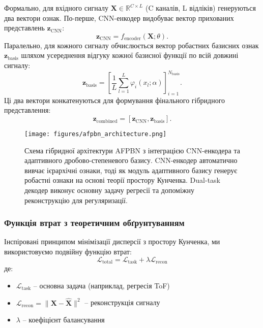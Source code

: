 \documentclass[12pt,a4paper]{article}
\begin{document}
Формально, для вхідного сигналу $\mathbf{X} \in \mathbb{R}^{C \times L}$ (C каналів, L відліків) генеруються два вектори ознак. По-перше, CNN-енкодер видобуває вектор прихованих представлень $\mathbf{z}_{\text{CNN}}$:
\begin{equation}
	\mathbf{z}_{\text{CNN}} = f_{\text{encoder}}(\mathbf{X}; \theta).
\end{equation}
Паралельно, для кожного сигналу обчислюється вектор робастних базисних ознак $\mathbf{z}_{\text{basis}}$ шляхом усереднення відгуку кожної базисної функції по всій довжині сигналу:
\begin{equation}
	\mathbf{z}_{\text{basis}} = \left[\frac{1}{L} \sum_{l=1}^L \varphi_i(x_l; \alpha)\right]_{i=1}^{N_{\text{basis}}}.
\end{equation}
Ці два вектори конкатенуються для формування фінального гібридного представлення:
\begin{equation}
	\mathbf{z}_{\text{combined}} = [\mathbf{z}_{\text{CNN}}, \mathbf{z}_{\text{basis}}].
\end{equation}

\begin{figure}[htbp]
	\centering
	\texttt{[image: figures/afpbn\_architecture.png]}
	\caption{Схема гібридної архітектури AFPBN з інтеграцією CNN-енкодера та адаптивного дробово-степеневого базису. CNN-енкодер автоматично вивчає ієрархічні ознаки, тоді як модуль адаптивного базису генерує робастні ознаки на основі теорії простору Кунченка. Dual-task декодер виконує основну задачу регресії та допоміжну реконструкцію для регуляризації.}
	\label{fig:hybrid_architecture}
\end{figure}

\subsubsection{Функція втрат з теоретичним обґрунтуванням}

Інспіровані принципом мінімізації дисперсії з простору Кунченка, ми використовуємо подвійну функцію втрат:
\begin{equation}
	\mathcal{L}_{\text{total}} = \mathcal{L}_{\text{task}} + \lambda \mathcal{L}_{\text{recon}}
\end{equation}
де:
\begin{itemize}
	\item $\mathcal{L}_{\text{task}}$ -- основна задача (наприклад, регресія ToF)
	\item $\mathcal{L}_{\text{recon}} = \|\mathbf{X} - \hat{\mathbf{X}}\|^2$ -- реконструкція сигналу
	\item $\lambda$ -- коефіцієнт балансування
\end{itemize}
\end{document}
